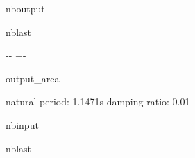 \documentclass[letterpaper,10pt,english]{sphinxmanual}
\begin{document}
\begin{sphinxuseclass}{nboutput}
\begin{sphinxuseclass}{nblast}
{

\kern-\sphinxverbatimsmallskipamount\kern-\baselineskip
\kern+\FrameHeightAdjust\kern-\fboxrule
\vspace{\nbsphinxcodecellspacing}

\begin{sphinxuseclass}{output_area}
\begin{sphinxuseclass}{}


\begin{sphinxVerbatim}[commandchars=\\\{\}]
natural period: 1.1471s
damping ratio: 0.01
\end{sphinxVerbatim}



\end{sphinxuseclass}
\end{sphinxuseclass}
}

\end{sphinxuseclass}
\end{sphinxuseclass}
\begin{sphinxuseclass}{nbinput}
\begin{sphinxuseclass}{nblast}
{
\begin{sphinxVerbatim}[commandchars=\\\{\}]
\llap{\color{nbsphinxin}[3]:\,\hspace{\fboxrule}\hspace{\fboxsep}}
         
         
        
          
  \PYG{p}{[}    \PYG{p}{]} 
\end{sphinxVerbatim}
}

\end{sphinxuseclass}
\end{sphinxuseclass}
\end{document}
